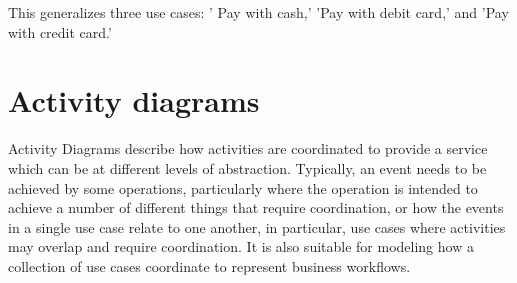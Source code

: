 \documentclass[a4paper,12pt]{article}
\begin{document}
 This generalizes three use cases: ' Pay with cash,' 'Pay with debit card,' and 'Pay with credit card.'

\newpage
\section{Activity diagrams}
Activity Diagrams describe how activities are coordinated to provide a service which can be at different levels of abstraction. Typically, an event needs to be achieved by some operations, particularly where the operation is intended to achieve a number of different things that require coordination, or how the events in a single use case relate to one another, in particular, use cases where activities may overlap and require coordination. It is also suitable for modeling how a collection of use cases coordinate to represent business workflows.
\end{document}
